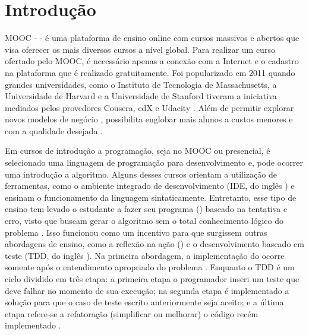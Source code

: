 \chapter{Introdução}

	MOOC -  - é uma plataforma de ensino online
	com cursos massivos e abertos que visa oferecer os mais diversos cursos a nível
	global.	Para realizar um curso ofertado pelo MOOC, é necessário	apenas a conexão
	com a Internet e o cadastro na plataforma que é realizado gratuitamente. Foi
	popularizado em 2011 quando grandes universidades, como o Instituto de Tecnologia
	de Massachusetts, a Universidade de Harvard e a Universidade de Stanford tiveram
	a iniciativa mediados pelos provedores Cousera, edX e Udacity \cite{Mehlenbacher:2012}.
	Além de permitir explorar novos modelos de negócio \cite{dellarocas2013money},
	possibilita englobar mais alunos a custos menores e com a qualidade desejada
	\cite{schmidt2013producing}.
	
	Em cursos de introdução a programação, seja no MOOC ou presencial, é selecionado
	uma linguagem de programação para desenvolvimento e, pode ocorrer uma introdução
	a algoritmo. Alguns desses cursos orientam a utilização de ferramentas, como o
	ambiente integrado de desenvolvimento (IDE, do inglês ) e ensinam o funcionamento da linguagem sintaticamente.
	Entretanto, esse tipo de ensino tem levado o estudante a fazer seu programa
	() baseado na tentativa e erro, visto que buscam gerar o
	algoritmo sem o total conhecimento lógico do problema \cite{edwards2003}. Isso
	funcionou como um incentivo para que surgissem outras abordagens de ensino,
	como a reflexão na ação () e o desenvolvimento
	baseado em teste (TDD, do inglês ). Na
	primeira abordagem, a implementação do  ocorre somente
	após o entendimento apropriado do problema \cite{edwards2004}. Enquanto o
	TDD é um ciclo dividido em três etapa: a primeira etapa o programador inseri um
	teste que deve falhar no momento de sua execução; na segunda etapa é implementado
	a solução para que o caso de teste escrito anteriormente seja aceito; e a última
	etapa refere-se a refatoração (simplificar ou melhorar) o código recém implementado \cite{beck2003}.
	

